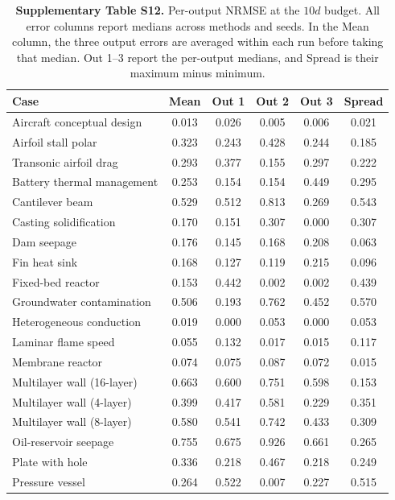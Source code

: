 \begin{table}[htbp]
\centering
\caption{\textbf{Supplementary Table S12.} Per-output NRMSE at the $10d$ budget. All error columns report medians across methods and seeds. In the Mean column, the three output errors are averaged within each run before taking that median. Out 1--3 report the per-output medians, and Spread is their maximum minus minimum.}
\label{tab:si_per_output}
\SITableFont
\setlength{\tabcolsep}{4pt}
\begin{tabular}{@{}lccccc@{}}
\toprule
\textbf{Case} & \textbf{Mean} & \textbf{Out 1} & \textbf{Out 2} & \textbf{Out 3} & \textbf{Spread} \\
\midrule
Aircraft conceptual design & 0.013 & 0.026 & 0.005 & 0.006 & 0.021 \\
Airfoil stall polar & 0.323 & 0.243 & 0.428 & 0.244 & 0.185 \\
Transonic airfoil drag & 0.293 & 0.377 & 0.155 & 0.297 & 0.222 \\
Battery thermal management & 0.253 & 0.154 & 0.154 & 0.449 & 0.295 \\
Cantilever beam & 0.529 & 0.512 & 0.813 & 0.269 & 0.543 \\
Casting solidification & 0.170 & 0.151 & 0.307 & 0.000 & 0.307 \\
Dam seepage & 0.176 & 0.145 & 0.168 & 0.208 & 0.063 \\
Fin heat sink & 0.168 & 0.127 & 0.119 & 0.215 & 0.096 \\
Fixed-bed reactor & 0.153 & 0.442 & 0.002 & 0.002 & 0.439 \\
Groundwater contamination & 0.506 & 0.193 & 0.762 & 0.452 & 0.570 \\
Heterogeneous conduction & 0.019 & 0.000 & 0.053 & 0.000 & 0.053 \\
Laminar flame speed & 0.055 & 0.132 & 0.017 & 0.015 & 0.117 \\
Membrane reactor & 0.074 & 0.075 & 0.087 & 0.072 & 0.015 \\
Multilayer wall (16-layer) & 0.663 & 0.600 & 0.751 & 0.598 & 0.153 \\
Multilayer wall (4-layer) & 0.399 & 0.417 & 0.581 & 0.229 & 0.351 \\
Multilayer wall (8-layer) & 0.580 & 0.541 & 0.742 & 0.433 & 0.309 \\
Oil-reservoir seepage & 0.755 & 0.675 & 0.926 & 0.661 & 0.265 \\
Plate with hole & 0.336 & 0.218 & 0.467 & 0.218 & 0.249 \\
Pressure vessel & 0.264 & 0.522 & 0.007 & 0.227 & 0.515 \\

\end{tabular}
\end{table}
